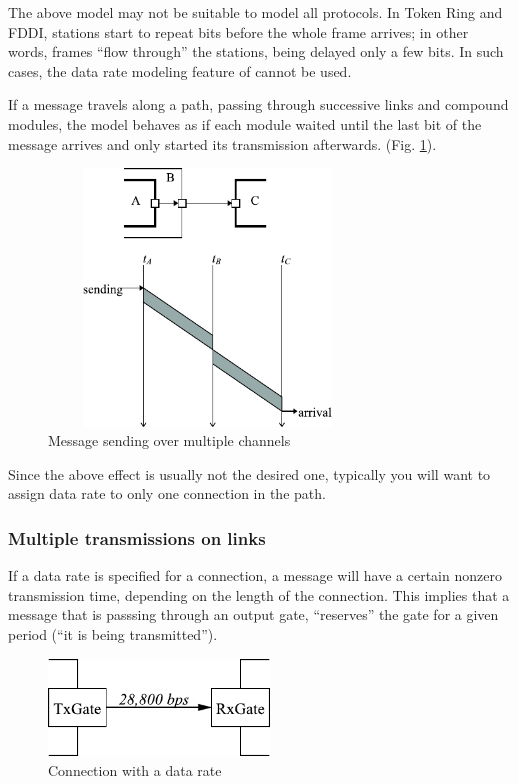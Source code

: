 The above model may not be suitable to model all protocols. In Token Ring
and FDDI, stations start to repeat bits before the whole frame arrives;
in other words, frames ``flow through'' the stations, being delayed only a few bits.
In such cases, the data rate modeling feature of {\opp} cannot be used.

If a message travels along a path, passing through successive links and
compound modules, the model behaves as if each module waited until the
last bit of the message arrives and only started its transmission
afterwards.
(Fig. \ref{fig:ch-overview:msg-multiple-ch}).

\begin{figure}[htbp]
\begin{center}
\includegraphics[width=3.330in, height=2.692in]{figures/usmanFig5}
\caption{Message sending over multiple channels}
\label{fig:ch-overview:msg-multiple-ch}
\end{center}
\end{figure}

Since the above effect is usually not the desired one, typically
you will want to assign data rate to only one connection in the
path.


\subsubsection{Multiple transmissions on links}

If a data rate is specified for a connection, a message
will have a certain nonzero transmission time, depending on the length of the connection. This implies that
a message that is passsing through an output gate, ``reserves'' the gate
for a given period (``it is being transmitted'').

\begin{figure}[htbp]
  \begin{center}
    \includegraphics[width=2.315in, height=1.015in]{figures/usmanFig9}
    \caption{Connection with a data rate}
    \label{fig:ch-simple-modules:conn-w-data-rate}
  \end{center}
\end{figure}

